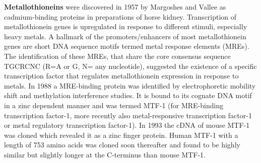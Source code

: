 \textbf{Metallothioneins} were discovered in 1957 by Margoshes and Vallee as cadmium-binding proteins in preparations of horse kidney. Transcription of metallothionein genes is upregulated in response to different stimuli, especially heavy metals. A hallmark of the promoters/enhancers of most metallothionein genes are short DNA sequence motifs termed metal response elements (MREs). The identification of these MREs, that share the core consensus sequence TGCRCNC (R=A or G, N= any nucleotide), suggested the existence of a specific transcription factor that regulates metallothionein expression in response to metals. In 1988 a MRE-binding protein was identified by electrophoretic mobility shift and methylation interference studies. It is bound to its cognate DNA motif in a zinc dependent manner  and was termed MTF-1 (for MRE-binding transcription factor-1, more recently also metal-responsive transcription factor-1 or metal regulatory transcription factor-1). In 1993 the cDNA of mouse MTF-1 was cloned which revealed it as a zinc finger protein. Human MTF-1 with a length of 753 amino acids was cloned soon thereafter and found to be highly similar but slightly longer at the C-terminus than mouse MTF-1. 